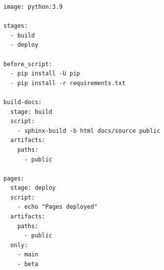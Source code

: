\begin{lstlisting}
image: python:3.9

stages:
  - build
  - deploy

before_script:
  - pip install -U pip
  - pip install -r requirements.txt

build-docs:
  stage: build
  script:
    - sphinx-build -b html docs/source public
  artifacts:
    paths:
      - public

pages:
  stage: deploy
  script:
    - echo "Pages deployed"
  artifacts:
    paths:
      - public
  only:
    - main
    - beta

\end{lstlisting}
